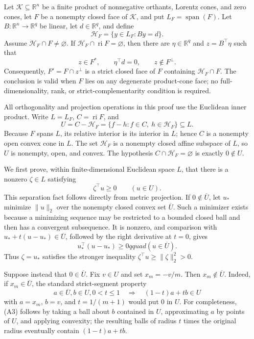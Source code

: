 Let \(\mathcal K\subseteq\mathbb R^n\) be a finite product of nonnegative orthants, Lorentz cones, and zero cones, let \(F\) be a nonempty closed face of \(\mathcal K\), and put \(L_F=\operatorname{span}(F)\).  Let \(B:\mathbb R^n\to\mathbb R^q\) be linear, let \(d\in\mathbb R^q\), and define
\[
 \mathcal H_F=\{y\in L_F:By=d\}.
\]
Assume \(\mathcal H_F\cap F\ne\varnothing\).  If \(\mathcal H_F\cap\operatorname{ri}F=\varnothing\), then there are \(\eta\in\mathbb R^q\) and \(z=B^{\top}\eta\) such that
\[
 z\in F^*,\qquad \eta^{\top}d=0,
 \qquad z\notin F^\perp.
\]
Consequently, \(F'=F\cap z^\perp\) is a strict closed face of \(F\) containing \(\mathcal H_F\cap F\).  The conclusion is valid when \(F\) lies on any degenerate product-cone face; no full-dimensionality, rank, or strict-complementarity condition is required.

All orthogonality and projection operations in this proof use the Euclidean inner product.  Write \(L=L_F\), \(C=\operatorname{ri}F\), and
\[
 U=C-\mathcal H_F=\{f-h:f\in C,\ h\in\mathcal H_F\}\subseteq L.       \tag{A1}
\]
Because \(F\) spans \(L\), its relative interior is its interior in \(L\); hence \(C\) is a nonempty open convex cone in \(L\).  The set \(\mathcal H_F\) is a nonempty closed affine subspace of \(L\), so \(U\) is nonempty, open, and convex.  The hypothesis \(C\cap\mathcal H_F=\varnothing\) is exactly \(0\notin U\).

We first prove, within finite-dimensional Euclidean space \(L\), that there is a nonzero \(\zeta\in L\) satisfying
\[
 \zeta^{\top}u\geq0\qquad(u\in U).                                    \tag{A2}
\]
This separation fact follows directly from metric projection.  If \(0\notin\overline U\), let \(u_*\) minimize \(\|u\|_2\) over the nonempty closed convex set \(\overline U\).  Such a minimizer exists because a minimizing sequence may be restricted to a bounded closed ball and then has a convergent subsequence.  It is nonzero, and comparison with \(u_*+t(u-u_*)\in\overline U\), followed by the right derivative at \(t=0\), gives
\[
 u_*^{\top}(u-u_*)\geq0qquad(u\in\overline U).
\]
Thus \(\zeta=u_*\) satisfies the stronger inequality \(\zeta^{\top}u\geq\|\zeta\|_2^2>0\).

Suppose instead that \(0\in\overline U\).  Fix \(v\in U\) and set \(x_m=-v/m\).  Then \(x_m\notin\overline U\).  Indeed, if \(x_m\in\overline U\), the standard strict-segment property
\[
 a\in\overline U, b\in U, 0<t\leq1
 \quad\Longrightarrow\quad (1-t)a+tb\in U                            \tag{A3}
\]
with \(a=x_m\), \(b=v\), and \(t=1/(m+1)\) would put \(0\) in \(U\).  For completeness, (A3) follows by taking a ball about \(b\) contained in \(U\), approximating \(a\) by points of \(U\), and applying convexity; the resulting balls of radius \(t\) times the original radius eventually contain \((1-t)a+tb\).

